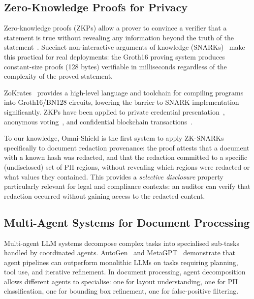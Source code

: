 \documentclass[conference]{IEEEtran}
\begin{document}
\subsection{Zero-Knowledge Proofs for Privacy}

Zero-knowledge proofs (ZKPs) allow a prover to
convince a verifier that a statement is true without
revealing any information beyond the truth of the
statement~\cite{goldwasser1989knowledge}.
Succinct non-interactive arguments of knowledge
(SNARKs)~\cite{groth2016size} make this practical for
real deployments: the Groth16 proving system produces
constant-size proofs (128 bytes) verifiable in
milliseconds regardless of the complexity of the
proved statement.

ZoKrates~\cite{eberhardt2018zokrates} provides a
high-level language and toolchain for compiling
programs into Groth16/BN128 circuits, lowering the
barrier to SNARK implementation significantly.
ZKPs have been applied to private credential
presentation~\cite{camenisch1997efficient},
anonymous voting~\cite{cortier2019belenios},
and confidential blockchain
transactions~\cite{sasson2014zerocash}.

To our knowledge, Omni-Shield is the first system to
apply ZK-SNARKs specifically to document redaction
provenance: the proof attests that a document with
a known hash was redacted, and that the redaction
committed to a specific (undisclosed) set of PII
regions, without revealing which regions were redacted
or what values they contained.
This provides a \emph{selective disclosure} property
particularly relevant for legal and compliance contexts:
an auditor can verify that redaction occurred without
gaining access to the redacted content.

\subsection{Multi-Agent Systems for Document Processing}

Multi-agent LLM systems decompose complex tasks into
specialised sub-tasks handled by coordinated agents.
AutoGen~\cite{wu2023autogen} and
MetaGPT~\cite{hong2023metagpt} demonstrate that
agent pipelines can outperform monolithic LLMs on
tasks requiring planning, tool use, and iterative
refinement.
In document processing, agent decomposition allows
different agents to specialise: one for layout
understanding, one for PII classification, one for
bounding box refinement, one for false-positive
filtering.
\end{document}
